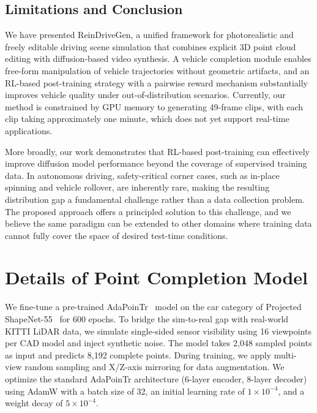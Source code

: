 \documentclass[runningheads]{llncs}
\begin{document}
\subsection{Limitations and Conclusion}
\label{sec:conclusion}


We have presented ReinDriveGen, a unified framework for photorealistic and freely editable driving scene simulation that combines explicit 3D point cloud editing with diffusion-based video synthesis. A vehicle completion module enables free-form manipulation of vehicle trajectories without geometric artifacts, and an RL-based post-training strategy with a pairwise reward mechanism substantially improves vehicle quality under out-of-distribution scenarios. Currently, our method is constrained by GPU memory to generating 49-frame clips, with each clip taking approximately one minute, which does not yet support real-time applications.

More broadly, our work demonstrates that RL-based post-training can effectively improve diffusion model performance beyond the coverage of supervised training data. In autonomous driving, safety-critical corner cases, such as in-place spinning and vehicle rollover, are inherently rare, making the resulting distribution gap a fundamental challenge rather than a data collection problem. The proposed approach offers a principled solution to this challenge, and we believe the same paradigm can be extended to other domains where training data cannot fully cover the space of desired test-time conditions.



%



\newpage
\appendix

\section{Details of Point Completion Model}
We fine-tune a pre-trained AdaPoinTr~\cite{yu2021pointr} model on the car category of Projected ShapeNet-55~\cite{chang2015shapenet} for 600 epochs. To bridge the sim-to-real gap with real-world KITTI LiDAR data, we simulate single-sided sensor visibility using 16 viewpoints per CAD model and inject synthetic noise. The model takes 2,048 sampled points as input and predicts 8,192 complete points. During training, we apply multi-view random sampling and X/Z-axis mirroring for data augmentation. We optimize the standard AdaPoinTr architecture (6-layer encoder, 8-layer decoder) using AdamW with a batch size of 32, an initial learning rate of \(1 \times 10^{-4}\), and a weight decay of \(5 \times 10^{-4}\).
\end{document}
